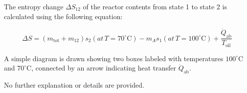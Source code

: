 The entropy change \( \Delta S_{12} \) of the reactor contents from state 1 to state 2 is calculated using the following equation:  

\[
\Delta S = (m_{\text{tot}} + m_{12}) s_2 (at \, T = 70^\circ\text{C}) - m_A s_1 (at \, T = 100^\circ\text{C}) + \frac{\dot{Q}_{\text{ab}}}{T_{\text{oil}}}
\]

A simple diagram is drawn showing two boxes labeled with temperatures \( 100^\circ\text{C} \) and \( 70^\circ\text{C} \), connected by an arrow indicating heat transfer \( \dot{Q}_{\text{ab}} \).  

No further explanation or details are provided.